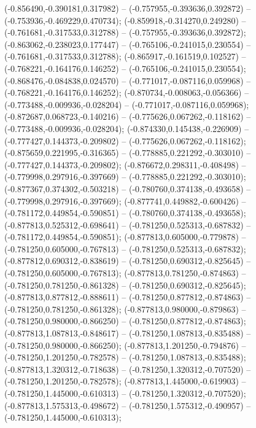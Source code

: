  (-0.856490,-0.390181,0.317982) -- (-0.757955,-0.393636,0.392872) -- (-0.753936,-0.469229,0.470734);
 (-0.859918,-0.314270,0.249280) -- (-0.761681,-0.317533,0.312788) -- (-0.757955,-0.393636,0.392872);
 (-0.863062,-0.238023,0.177447) -- (-0.765106,-0.241015,0.230554) -- (-0.761681,-0.317533,0.312788);
 (-0.865917,-0.161519,0.102527) -- (-0.768221,-0.164176,0.146252) -- (-0.765106,-0.241015,0.230554);
 (-0.868476,-0.084838,0.024570) -- (-0.771017,-0.087116,0.059968) -- (-0.768221,-0.164176,0.146252);
 (-0.870734,-0.008063,-0.056366) -- (-0.773488,-0.009936,-0.028204) -- (-0.771017,-0.087116,0.059968);
 (-0.872687,0.068723,-0.140216) -- (-0.775626,0.067262,-0.118162) -- (-0.773488,-0.009936,-0.028204);
 (-0.874330,0.145438,-0.226909) -- (-0.777427,0.144373,-0.209802) -- (-0.775626,0.067262,-0.118162);
 (-0.875659,0.221995,-0.316365) -- (-0.778885,0.221292,-0.303010) -- (-0.777427,0.144373,-0.209802);
 (-0.876672,0.298311,-0.408498) -- (-0.779998,0.297916,-0.397669) -- (-0.778885,0.221292,-0.303010);
 (-0.877367,0.374302,-0.503218) -- (-0.780760,0.374138,-0.493658) -- (-0.779998,0.297916,-0.397669);
 (-0.877741,0.449882,-0.600426) -- (-0.781172,0.449854,-0.590851) -- (-0.780760,0.374138,-0.493658);
 (-0.877813,0.525312,-0.698641) -- (-0.781250,0.525313,-0.687832) -- (-0.781172,0.449854,-0.590851);
 (-0.877813,0.605000,-0.779878) -- (-0.781250,0.605000,-0.767813) -- (-0.781250,0.525313,-0.687832);
 (-0.877812,0.690312,-0.838619) -- (-0.781250,0.690312,-0.825645) -- (-0.781250,0.605000,-0.767813);
 (-0.877813,0.781250,-0.874863) -- (-0.781250,0.781250,-0.861328) -- (-0.781250,0.690312,-0.825645);
 (-0.877813,0.877812,-0.888611) -- (-0.781250,0.877812,-0.874863) -- (-0.781250,0.781250,-0.861328);
 (-0.877813,0.980000,-0.879863) -- (-0.781250,0.980000,-0.866250) -- (-0.781250,0.877812,-0.874863);
 (-0.877813,1.087813,-0.848617) -- (-0.781250,1.087813,-0.835488) -- (-0.781250,0.980000,-0.866250);
 (-0.877813,1.201250,-0.794876) -- (-0.781250,1.201250,-0.782578) -- (-0.781250,1.087813,-0.835488);
 (-0.877813,1.320312,-0.718638) -- (-0.781250,1.320312,-0.707520) -- (-0.781250,1.201250,-0.782578);
 (-0.877813,1.445000,-0.619903) -- (-0.781250,1.445000,-0.610313) -- (-0.781250,1.320312,-0.707520);
 (-0.877813,1.575313,-0.498672) -- (-0.781250,1.575312,-0.490957) -- (-0.781250,1.445000,-0.610313);
